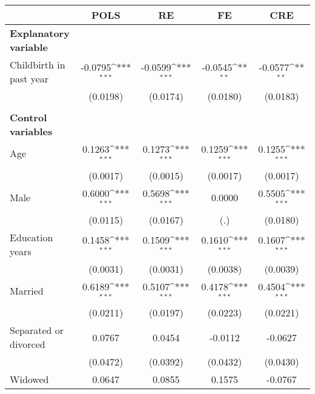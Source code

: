 {
\def\sym#1{\ifmmode^{#1}\else\(^{#1}\)\fi}
\begin{tabular}{l*{4}{c}}
\toprule
                    &\multicolumn{1}{c}{POLS}&\multicolumn{1}{c}{RE}&\multicolumn{1}{c}{FE}&\multicolumn{1}{c}{CRE}\\
\midrule
\textbf{Explanatory variable}&                     &                     &                     &                     \\
Childbirth in past year&     -0.0795\sym{***}&     -0.0599\sym{***}&     -0.0545\sym{**} &     -0.0577\sym{**} \\
                    &    (0.0198)         &    (0.0174)         &    (0.0180)         &    (0.0183)         \\
\\ \textbf{Control variables}&                     &                     &                     &                     \\
Age                 &      0.1263\sym{***}&      0.1273\sym{***}&      0.1259\sym{***}&      0.1255\sym{***}\\
                    &    (0.0017)         &    (0.0015)         &    (0.0017)         &    (0.0017)         \\
Male                &      0.6000\sym{***}&      0.5698\sym{***}&      0.0000         &      0.5505\sym{***}\\
                    &    (0.0115)         &    (0.0167)         &         (.)         &    (0.0180)         \\
Education years     &      0.1458\sym{***}&      0.1509\sym{***}&      0.1610\sym{***}&      0.1607\sym{***}\\
                    &    (0.0031)         &    (0.0031)         &    (0.0038)         &    (0.0039)         \\
Married             &      0.6189\sym{***}&      0.5107\sym{***}&      0.4178\sym{***}&      0.4504\sym{***}\\
                    &    (0.0211)         &    (0.0197)         &    (0.0223)         &    (0.0221)         \\
Separated or divorced&      0.0767         &      0.0454         &     -0.0112         &     -0.0627         \\
                    &    (0.0472)         &    (0.0392)         &    (0.0432)         &    (0.0430)         \\
Widowed             &      0.0647         &      0.0855         &      0.1575         &     -0.0767         \\

\end{tabular}}
